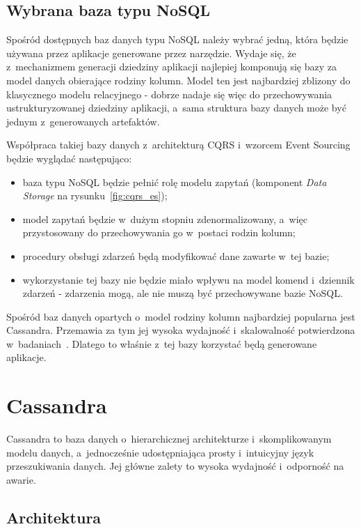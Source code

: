 \subsection{Wybrana baza typu NoSQL}

Spośród dostępnych baz danych typu NoSQL należy wybrać jedną, która będzie używana przez aplikacje generowane przez narzędzie.
Wydaje się, że z~mechanizmem generacji dziedziny aplikacji najlepiej komponują się bazy za model danych obierające rodziny kolumn.
Model ten jest najbardziej zblizony do klasycznego modelu relacyjnego - dobrze nadaje się więc do przechowywania ustrukturyzowanej dziedziny aplikacji, a~sama struktura bazy danych może być jednym z~generowanych artefaktów.

Współpraca takiej bazy danych z~architekturą CQRS i~wzorcem Event Sourcing będzie wyglądać następująco:

\begin{itemize}
 \item baza typu NoSQL będzie pełnić rolę modelu zapytań (komponent \emph{Data Storage} na rysunku~\ref{fig:cqrs_es});
 \item model zapytań będzie w~dużym stopniu zdenormalizowany, a~więc przystosowany do przechowywania go w~postaci rodzin kolumn;
 \item procedury obsługi zdarzeń będą modyfikować dane zawarte w~tej bazie;
 \item wykorzystanie tej bazy nie będzie miało wpływu na model komend i~dziennik zdarzeń - zdarzenia mogą, ale nie muszą być przechowywane bazie NoSQL.
\end{itemize}

Spośród baz danych opartych o~model rodziny kolumn najbardziej popularna jest Cassandra.
Przemawia za tym jej wysoka wydajność i~skalowalność potwierdzona w~badaniach~\cite{cassandra_perf}.
Dlatego to właśnie z~tej bazy korzystać będą generowane aplikacje.



\section{Cassandra}

Cassandra to baza danych o~hierarchicznej architekturze i~skomplikowanym modelu danych, a~jednocześnie udostępniająca prosty i~intuicyjny język przeszukiwania danych.
Jej główne zalety to wysoka wydajność i~odporność na awarie.


\subsection{Architektura}

